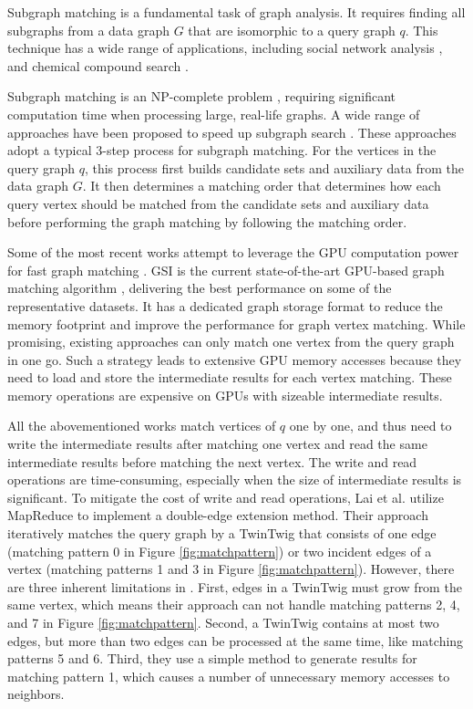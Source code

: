 Subgraph matching is a fundamental task of graph analysis. It requires finding all subgraphs from a data graph $G$ that are isomorphic to a
query graph $q$. This technique has a wide range of applications, including social network analysis \cite{wang2012truss,kairam2012The}, and chemical compound
search \cite{wooyoung2011Biological}.

Subgraph matching is an NP-complete problem \cite{garey1979Computers}, requiring significant computation time when processing large, real-life
graphs. A wide range of approaches have been proposed to speed up subgraph search
\cite{bhattarai2019ceci,guo2020gpu,tran2015fast,shi2020graphpi,bi2016efficient,zeng2020gsi,sun2020subgraph,guo2020exploiting,sun2020rapidmatch,lin2016network}.
These approaches adopt a typical 3-step process for subgraph matching. For the vertices in the query graph $q$, this process first builds
candidate sets and auxiliary data from the data graph $G$. It then determines a matching order that determines how each query vertex
should be matched from the candidate sets and auxiliary data before performing the graph matching by following the matching order.

Some of the most recent works attempt to leverage the GPU computation power for fast graph matching
\cite{lin2016network,guo2020gpu,tran2015fast,zeng2020gsi,guo2020exploiting}. GSI is the current state-of-the-art GPU-based graph matching
algorithm \cite{zeng2020gsi}, delivering the best performance on some of the representative datasets. It has a dedicated graph storage
format to reduce the memory footprint and improve the performance for graph vertex matching. While promising, existing approaches can
only match one vertex from the query graph in one go. Such a strategy leads to extensive GPU memory accesses because they need to load and
store the intermediate results for each vertex matching. These memory operations are expensive on GPUs with sizeable intermediate results.



All the abovementioned works match vertices of $q$ one by one, and thus need to write the intermediate results after matching one vertex
and read the same intermediate results before matching the next vertex. The write and read operations are time-consuming, especially when
the size of intermediate results is significant. To mitigate the cost of write and read operations, Lai et al. \cite{lai2015scalable}
utilize MapReduce to implement a double-edge extension method. Their approach iteratively matches the query graph by a TwinTwig that
consists of one edge (matching pattern 0 in Figure \ref{fig:matchpattern}) or two incident edges of a vertex (matching patterns 1 and 3 in
Figure \ref{fig:matchpattern}). However, there are three inherent limitations in \cite{lai2015scalable}. First, edges in a TwinTwig must
grow from the same vertex, which means their approach can not handle matching patterns 2, 4, and 7 in Figure \ref{fig:matchpattern}.
Second, a TwinTwig contains at most two edges, but more than two edges can be processed at the same time, like matching patterns 5 and 6.
Third, they use a simple method to generate results for matching pattern 1, which causes a number of unnecessary memory accesses to
neighbors.

